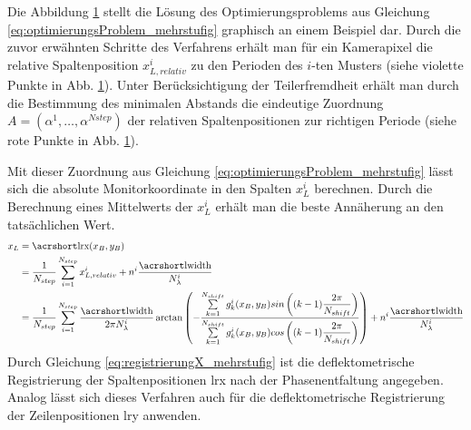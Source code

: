 {
	\begin{figure}[H]
		\centering
		
		\label{tikz:abbBestimmungEindeutigerPosition}
	\end{figure}
}

\noindent
Die Abbildung \ref{tikz:abbBestimmungEindeutigerPosition} stellt die Lösung des Optimierungsproblems aus Gleichung \ref{eq:optimierungsProblem_mehrstufig} graphisch an einem Beispiel dar.
Durch die zuvor erwähnten Schritte des Verfahrens erhält man für ein Kamerapixel die relative Spaltenposition $x_{L,relativ}^i$ zu den Perioden des $i$-ten Musters (siehe violette Punkte in Abb. \ref{tikz:abbBestimmungEindeutigerPosition}).
Unter Berücksichtigung der Teilerfremdheit erhält man durch die Bestimmung des minimalen Abstands die eindeutige Zuordnung $\mathrm{\textit{A}} = (\alpha^1,\ldots,\alpha^{N{step}})$ der relativen Spaltenpositionen zur richtigen Periode (siehe rote Punkte in Abb. \ref{tikz:abbBestimmungEindeutigerPosition}).

\p
Mit dieser Zuordnung aus Gleichung \ref{eq:optimierungsProblem_mehrstufig} lässt sich die absolute Monitorkoordinate in den Spalten $x_L^i$ berechnen.
Durch die Berechnung eines Mittelwerts der $x_L^i$ erhält man die beste Annäherung an den tatsächlichen Wert.
%
\begin{equation}\label{eq:registrierungX_mehrstufig}
	\begin{split}
		x_L
		& =
			\acrshortmath{lrx}(x_B, y_B)\\
		& =
			\dfrac{1}{N_{step}}
			\sum\limits_{i = 1}^{N_{step}}
			x_{L,relativ}^i + n^i \dfrac{\acrshortmath{lwidth}}{N_\lambda^i}\\
		& =
			\dfrac{1}{N_{step}}
			\sum\limits_{i = 1}^{N_{step}}
			\dfrac{\acrshortmath{lwidth}}{2\pi N_\lambda^i}
			\arctan
			\left(
				-\dfrac
				{\sum\limits_{k=1}^{N_{shift}} g_k^i(x_B, y_B) sin\left((k - 1)\dfrac{2\pi}{N_{shift}}\right)}
				{\sum\limits_{k=1}^{N_{shift}} g_k^i(x_B, y_B) cos\left((k - 1)\dfrac{2\pi}{N_{shift}}\right)}
			\right)
			+ n^i \dfrac{\acrshortmath{lwidth}}{N_\lambda^i}
	\end{split}
\end{equation}
%
Durch Gleichung \ref{eq:registrierungX_mehrstufig} ist die deflektometrische Registrierung der Spaltenpositionen \acrshort{lrx} nach der Phasenentfaltung angegeben.
Analog lässt sich dieses Verfahren auch für die deflektometrische Registrierung der Zeilenpositionen \acrshort{lry} anwenden.

